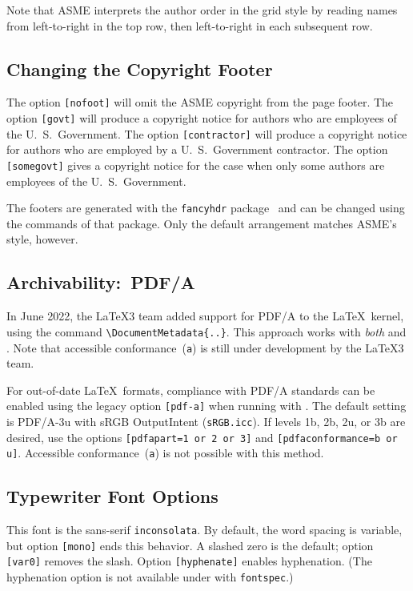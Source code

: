 \documentclass[captionpatch,colorlinks,upint,subscriptcorrection,varvw,german]{asmeconf}
\begin{document}
Note that ASME interprets the author order in the grid style by reading names from left-to-right in the top row, then left-to-right in each subsequent row.

\subsection{Changing the Copyright Footer} The option \texttt{[nofoot]} will omit the ASME copyright from the page footer. The option \texttt{[govt]} will produce a copyright notice for authors who are employees of the U.\ S.\ Government.
The option \texttt{[contractor]} will produce a copyright
notice for authors who are employed by a U.\ S.\ Government contractor.
The option \texttt{[somegovt]} gives a copyright notice for the case when only some authors are employees of the U.\ S.\ Government.

The footers are generated with the \texttt{fancyhdr} package~\cite{oostrum} and can be changed using the commands of that package. Only the default arrangement matches ASME's style, however.

\subsection{Archivability:~PDF/A} In June 2022, the \LaTeX 3 team added support for PDF/A to the \LaTeX\ kernel, using the command \verb|\DocumentMetadata{..}|. This approach works with \textit{both}  and . Note that accessible  conformance~(\texttt{a}) is still under development by the  \LaTeX3 team.

For out-of-date \LaTeX\ formats, compliance with PDF/A standards can be enabled using the legacy option \texttt{[pdf-a]} when running with . The default setting is PDF/A-3u with sRGB OutputIntent (\texttt{sRGB.icc}). If levels 1b, 2b, 2u, or 3b are desired, use the
options \texttt{[pdfapart=1 or 2 or 3]} and  \texttt{[pdfaconformance=b or u]}. Accessible  conformance~(\texttt{a}) is not possible with this method.

\subsection{Typewriter Font Options} This font is the sans-serif \texttt{inconsolata}. By default, the word spacing is variable, but option \texttt{[mono]} ends this behavior. A slashed zero is the default; option \texttt{[var0]} removes the slash. Option \texttt{[hyphenate]} enables hyphenation. (The hyphenation option is not available under  with \texttt{fontspec}.)
\end{document}
